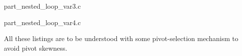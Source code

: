 
{part_nested_loop_var3.c}


{part_nested_loop_var4.c}

All these listings are to be understood with some pivot-selection mechanism to avoid pivot
skewness.

